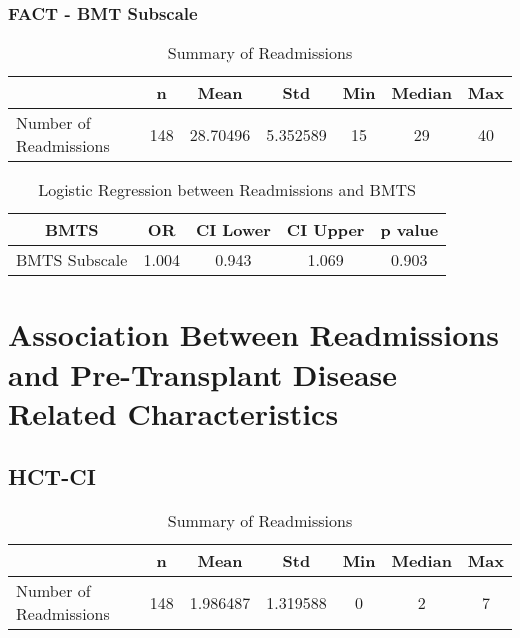 \documentclass[12pt,]{article}
\begin{document}
\pagebreak

\subsubsection{FACT - BMT Subscale}\label{fact---bmt-subscale}

\begin{table}[!h]

\caption{\label{tab:unnamed-chunk-35}Summary of Readmissions}
\centering
\begin{tabular}{>{\raggedright\arraybackslash}p{5cm}cccccc}
\toprule
  & n & Mean & Std & Min & Median & Max\\
\midrule
\rowcolor{white}  Number of Readmissions & 148 & 28.70496 & 5.352589 & 15 & 29 & 40\\
\bottomrule
\end{tabular}
\end{table}

\begin{table}[!h]

\caption{\label{tab:unnamed-chunk-35}Logistic Regression between Readmissions and BMTS}
\centering
\begin{tabular}{ccccc}
\toprule
BMTS & OR & CI Lower & CI Upper & p value\\
\midrule
\rowcolor{white}  BMTS Subscale & 1.004 & 0.943 & 1.069 & 0.903\\
\bottomrule
\end{tabular}
\end{table}

\pagebreak

\section{Association Between Readmissions and Pre-Transplant Disease
Related
Characteristics}\label{association-between-readmissions-and-pre-transplant-disease-related-characteristics}

\subsection{HCT-CI}\label{hct-ci}

\begin{table}[!h]

\caption{\label{tab:unnamed-chunk-36}Summary of Readmissions}
\centering
\begin{tabular}{>{\raggedright\arraybackslash}p{5cm}cccccc}
\toprule
  & n & Mean & Std & Min & Median & Max\\
\midrule
\rowcolor{white}  Number of Readmissions & 148 & 1.986487 & 1.319588 & 0 & 2 & 7\\
\bottomrule
\end{tabular}
\end{table}
\end{document}
